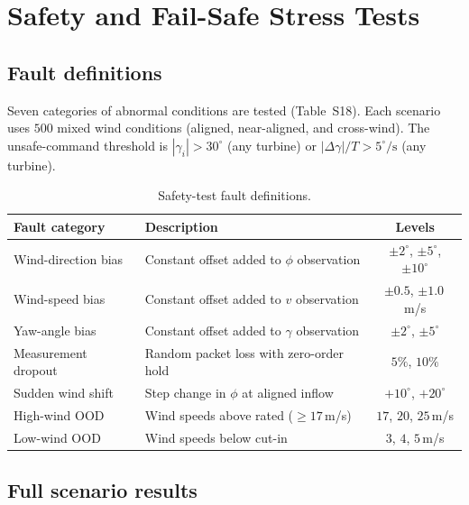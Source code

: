 \documentclass{article}
\begin{document}
\section{Safety and Fail-Safe Stress Tests}\label{sec:safety_details}

\subsection{Fault definitions}

Seven categories of abnormal conditions are tested (Table~S18). Each scenario uses $500$ mixed wind conditions (aligned, near-aligned, and cross-wind). The unsafe-command threshold is $|\gamma_i|{>}30^\circ$ (any turbine) or $|\Delta\gamma|/T{>}5^\circ\!/\!\mathrm{s}$ (any turbine).

\begin{table}[h]
\centering
\caption{Safety-test fault definitions.}
\label{tab:safety_faults}
\small
\begin{tabular}{lp{6cm}c}
\toprule
Fault category & Description & Levels \\
\midrule
Wind-direction bias & Constant offset added to $\phi$ observation & $\pm2^\circ$, $\pm5^\circ$, $\pm10^\circ$ \\
Wind-speed bias      & Constant offset added to $v$ observation   & $\pm0.5$, $\pm1.0$\,m/s \\
Yaw-angle bias       & Constant offset added to $\gamma$ observation & $\pm2^\circ$, $\pm5^\circ$ \\
Measurement dropout  & Random packet loss with zero-order hold      & $5\%$, $10\%$ \\
Sudden wind shift    & Step change in $\phi$ at aligned inflow      & $+10^\circ$, $+20^\circ$ \\
High-wind OOD        & Wind speeds above rated (${\geq}17$\,m/s)   & $17$, $20$, $25$\,m/s \\
Low-wind OOD         & Wind speeds below cut-in                     & $3$, $4$, $5$\,m/s \\
\bottomrule
\end{tabular}
\end{table}

\subsection{Full scenario results}
\end{document}
